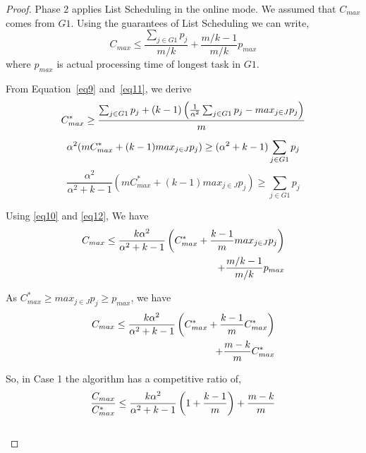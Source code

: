 \begin{proof}
   Phase 2 applies List Scheduling in the online mode. We assumed that
   $C_{max}$ comes from $G1$. Using the guarantees of List Scheduling
   we can write,
   \begin{equation}\label{eq10}
     C_{max} \leq \frac{\sum_{j \in G1 }^{}{{p_{j}}}}{m/k} + {\frac{m/k-1}{m/k}} p_{max}
   \end{equation}
   where $p_{max}$ is actual processing time of longest task in $G1$.
 
   From Equation~\ref{eq9} and~\ref{eq11}, we derive
   \begin{equation}{\nonumber}
     C_{max}^{*} \geq  \frac{\sum_{j \in G1 }^{}{{p_{j}}}+ (k-1)\left(\frac{1}{\alpha^{2}}\sum_{j \in G1 }^{}{{p_{j}}}-  {max_{j \in J}}{{p_{j}}}\right)}{m}
   \end{equation}
   \begin{equation}{\nonumber}
     \alpha^{2} (mC_{max}^{*} + (k-1){max_{j \in J}}{{p_{j}}}) \geq  (\alpha^{2} + k-1) \sum_{j \in G1 }^{}{{p_{j}}}  
   \end{equation}
   \begin{equation}\label{eq12}
     \frac{\alpha^{2}}{\alpha^{2}+k-1}\left(m C_{max}^{*}+(k-1) {max_{j \in J}}{{p_{j}}}\right) \geq \sum_{j \in G1 }^{}{{p_{j}}}  
   \end{equation}
   
   Using \ref{eq10} and \ref{eq12}, We have
   \begin{align}{\nonumber}
     C_{max} \leq \frac{k\alpha^{2}}{\alpha^{2}+k-1}\left( C_{max}^{*}+\frac{k-1}{m} {max_{j \in J}}{{p_{j}}}\right)\\
     + {\frac{m/k-1}{m/k}} p_{max} \nonumber
   \end{align}
   
   As $C_{max}^{*}\geq {{max_{j \in J}}{p_{j}}}\geq p_{max}$, we have
   \begin{align}{\nonumber}
     C_{max} \leq \frac{k\alpha^{2}}{\alpha^{2}+k-1}\left( C_{max}^{*}+ {\frac{k-1}{m}}{C_{max}^{*}}\right)\\
     + {\frac{m-k}{m}} C_{max}^{*} \nonumber
   \end{align}    
   
   So, in Case 1 the algorithm has a competitive ratio of,
   \begin{equation}{\nonumber}
     \frac{C_{max}}{C_{max}^{*}} \leq \frac{k\alpha^{2}}{\alpha^{2}+k-1}\left( 1+ {\frac{k-1}{m}} \right) + {\frac{m-k}{m}} \end{equation}\\
   

\end{proof}
